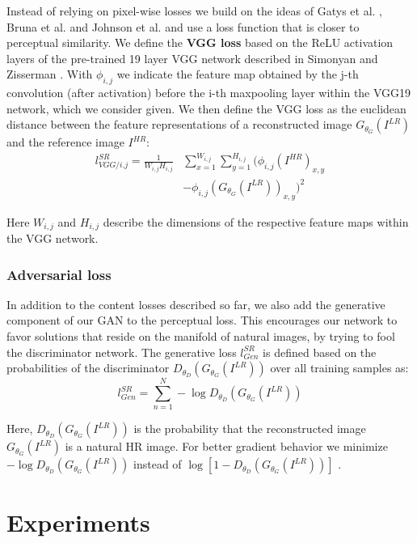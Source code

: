 \documentclass[10pt,twocolumn,letterpaper]{article}
\begin{document}
Instead of relying on pixel-wise losses we build on the ideas of Gatys et al. \cite{Gatys2015nips}, Bruna et al. \cite{bruna2016super} and Johnson et al. \cite{Johnson16PercepLoss} and use a loss function that is closer to perceptual similarity. We define the \textbf{VGG loss} based on the ReLU activation layers of the pre-trained 19 layer VGG network described in Simonyan and Zisserman \cite{simonyan2014very}. With $\phi_{i,j}$ we indicate the feature map obtained by the j-th convolution (after activation) before the i-th maxpooling layer within the VGG19 network, which we consider given.
We then define the VGG loss as the euclidean distance between the feature representations of a reconstructed image $G_{\theta_G}(I^{LR})$ and the reference image $I^{HR}$:
\begin{equation}
\begin{split}
l^{SR}_{VGG/i.j} =
\frac{1}{W_{i,j}H_{i,j}} & \sum_{x=1}^{W_{i,j}} \sum_{y=1}^{H_{i,j}} (\phi_{i,j}(I^{HR})_{x,y} \\
& - \phi_{i,j}(G_{\theta_G}(I^{LR}))_{x,y})^2
\end{split}
\label{eq:vgg}
\end{equation}

Here $W_{i,j}$ and $H_{i,j}$ describe the dimensions of the respective feature maps within the VGG network.

\subsubsection{Adversarial loss}
In addition to the content losses described so far, we also add the generative component of our \ac{GAN} to the perceptual loss. This encourages our network to favor solutions that reside on the manifold of natural images, by trying to fool the discriminator network. The generative loss $l^{SR}_{Gen}$ is defined based on the probabilities of the discriminator $D_{\theta_D}(G_{\theta_G}(I^{LR}))$ over all training samples as:
\begin{equation}
l^{SR}_{Gen} = \sum_{n=1}^{N} -\log D_{\theta_D}(G_{\theta_G}(I^{LR}))
\end{equation}

Here, $D_{\theta_D}(G_{\theta_G}(I^{LR}))$ is the probability that the
reconstructed image $G_{\theta_G}(I^{LR})$ is a natural HR image. For better gradient behavior we minimize $-\log D_{\theta_D}(G_{\theta_G}(I^{LR}))$ instead of $\log [1-D_{\theta_D}(G_{\theta_G}(I^{LR}))]$ \cite{Goodfellow14GAN}.

%
\section{Experiments}
\label{sec:experiments}
\end{document}
